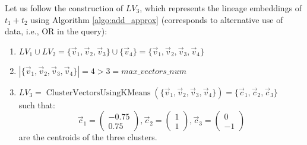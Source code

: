 \begin{example-withrun}
    Let us follow the construction of $LV_3$, which represents the lineage embeddings of $t_1 + t_2$ using Algorithm \ref{algo:add_approx} (corresponds to alternative use of data, i.e., OR in the query):
    \begin{enumerate}
        \item $LV_1 \cup LV_2 = \{\vec v_1, \vec v_2, \vec v_3\} \cup \{\vec v_4\} = \{\vec v_1, \vec v_2, \vec v_3, \vec v_4\}$
        \item $|\{\vec v_1, \vec v_2, \vec v_3, \vec v_4\}| = 4 > 3 = max\_vectors\_num$
        \item $LV_3 = \operatorname{ClusterVectorsUsingKMeans}(\{\vec v_1, \vec v_2, \vec v_3, \vec v_4\}) = \{\vec c_1, \vec c_2, \vec c_3\}$\\
        such that: 
        \begin{equation*}
            \vec c_1 = \begin{pmatrix} -0.75\\ 0.75 \end{pmatrix},
            \vec c_2 = \begin{pmatrix} 1\\ 1 \end{pmatrix},
            \vec c_3 = \begin{pmatrix} 0\\ -1 \end{pmatrix}
        \end{equation*}
        are the centroids of the three clusters.
    \end{enumerate}
\end{example-withrun}
